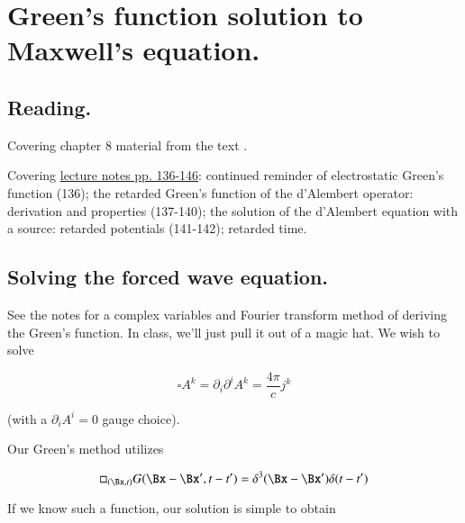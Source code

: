 %
%

\chapter{Green's function solution to Maxwell's equation.}
\label{chap:relativisticElectrodynamicsL18}
{}
\date{Mar 9, 2011}

\beginArtNoToc

\section{Reading.}

Covering chapter 8 material from the text \cite{landau1980classical}.

Covering \href{http://www.physics.utoronto.ca/~poppitz/epoppitz/PHY450_files/RelEMpp136-146.pdf}{lecture notes pp. 136-146}: continued reminder of electrostatic Green's function (136); the retarded Green's function of the d'Alembert operator: derivation and properties (137-140); the solution of the d'Alembert equation with a source: retarded potentials (141-142); retarded time.

\section{Solving the forced wave equation.}

See the notes for a complex variables and Fourier transform method of deriving the Green's function.  In class, we'll just pull it out of a magic hat.  We wish to solve

\begin{equation}\label{eqn:relativisticElectrodynamicsL18:10}
\square A^k = \partial_i \partial^i A^k = \frac{4 \pi}{c} j^k
\end{equation}

(with a $\partial_i A^i = 0$ gauge choice).

Our Green's method utilizes

\begin{equation}\label{eqn:relativisticElectrodynamicsL18:30}
\square_{(\Bx, t)} G(\Bx - \Bx', t - t') = \delta^3( \Bx - \Bx') \delta( t - t')
\end{equation}

If we know such a function, our solution is simple to obtain

